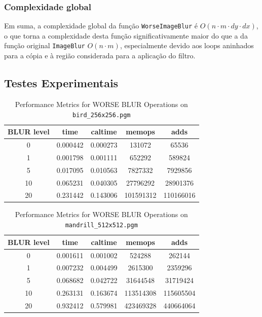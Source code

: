 \documentclass{report}
\begin{document}
\subsubsection{Complexidade global}
Em suma, a complexidade global da função \texttt{WorseImageBlur} é \(O(n \cdot m \cdot dy \cdot dx )\), o que torna a complexidade desta função significativamente maior do que a da função original \texttt{ImageBlur} \(O(n \cdot m)\),
especialmente devido aos loops aninhados para a cópia e à região considerada para a aplicação do filtro.


\subsection{Testes Experimentais}

\begin{table}[h]
    \centering
    \begin{tabular}{ccccc}
        \toprule
        \textbf{BLUR level} & \textbf{time} & \textbf{caltime} & \textbf{memops} & \textbf{adds} \\
        \midrule
        0 & 0.000442 & 0.000273 & 131072 & 65536 \\
        1 & 0.001798 & 0.001111 & 652292 & 589824 \\
        5 & 0.017095 & 0.010563 & 7827332 & 7929856 \\
        10 & 0.065231 & 0.040305 & 27796292 & 28901376 \\
        20 & 0.231442 & 0.143006 & 101591312 & 110166016 \\
        \bottomrule
    \end{tabular}
    \caption*{Performance Metrics for WORSE BLUR Operations on \texttt{bird\_256x256.pgm}}
\end{table}

\newpage


\begin{table}[h]
    \centering
    \begin{tabular}{ccccc}
        \toprule
        \textbf{BLUR level} & \textbf{time} & \textbf{caltime} & \textbf{memops} & \textbf{adds} \\
        \midrule
        0 & 0.001611 & 0.001002 & 524288 & 262144 \\
        1 & 0.007232 & 0.004499 & 2615300 & 2359296 \\
        5 & 0.068682 & 0.042722 & 31644548 & 31719424 \\
        10 & 0.263131 & 0.163674 & 113514308 & 115605504 \\
        20 & 0.932412 & 0.579981 & 423469328 & 440664064 \\
        \bottomrule
    \end{tabular}
    \caption*{Performance Metrics for WORSE BLUR Operations on \texttt{mandrill\_512x512.pgm}}
\end{table}
\end{document}
